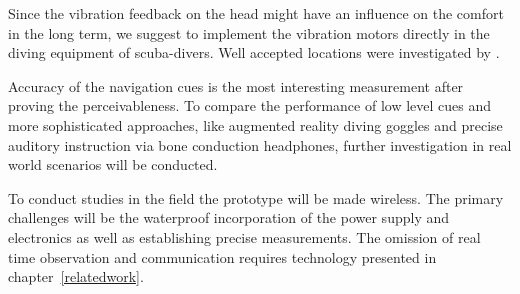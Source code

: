Since the vibration feedback on the head might have an influence on the comfort in the long term, we suggest to implement the vibration motors directly in the diving equipment of scuba-divers.
Well accepted locations were investigated by \cite{Kiss:2018:NSM:3173574.3174191}.

Accuracy of the navigation cues is the most interesting measurement after proving the perceivableness.
To compare the performance of low level cues and more sophisticated approaches, like augmented reality diving goggles and precise auditory instruction via bone conduction headphones, further investigation in real world scenarios will be conducted.

To conduct studies in the field the prototype will be made wireless.
The primary challenges will be the waterproof incorporation of the power supply and electronics as well as establishing precise measurements.
The omission of real time observation and communication requires technology presented in chapter~\ref{relatedwork}.


